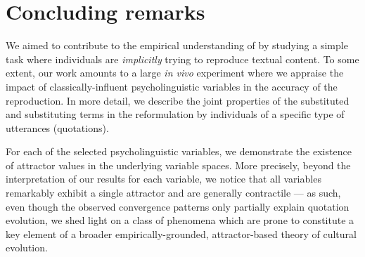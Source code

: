 \section{Concluding remarks}\label{sec:conclusion}
We aimed to contribute to the empirical understanding of   by studying a simple task where individuals are \emph{implicitly} trying to reproduce textual content. To some extent, our work amounts to a large \emph{in vivo} experiment where we appraise the impact of classically-influent psycholinguistic variables in the accuracy of the reproduction.
In more detail, we describe the joint properties of the substituted and substituting terms in the reformulation by individuals of a specific type of utterances (quotations). %

For each of the selected psycholinguistic variables, we demonstrate the existence of attractor values in the underlying variable spaces. More precisely, beyond the interpretation of our results for each variable, we notice that all variables remarkably exhibit a single attractor and are generally contractile --- as such, even though the observed convergence patterns only partially explain quotation evolution, we shed light on a class of phenomena which are prone to constitute a key element of a broader empirically-grounded, attractor-based theory of cultural evolution. 





